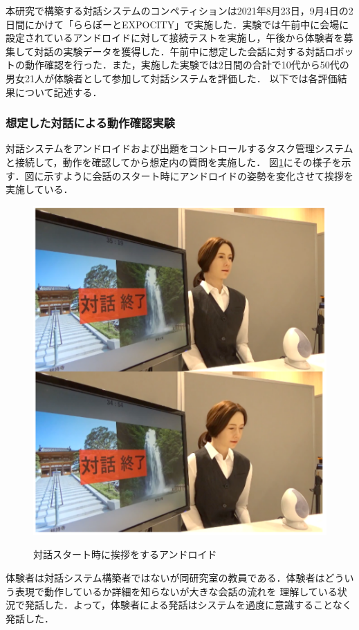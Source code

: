 本研究で構築する対話システムのコンペティションは2021年8月23日，9月4日の2日間にかけて「ららぽーとEXPOCITY」で実施した．実験では午前中に会場に設定されているアンドロイドに対して接続テストを実施し，午後から体験者を募集して対話の実験データを獲得した．午前中に想定した会話に対する対話ロボットの動作確認を行った．また，実施した実験では2日間の合計で10代から50代の男女21人が体験者として参加して対話システムを評価した．
以下では各評価結果について記述する．

\subsubsection{想定した対話による動作確認実験}
対話システムをアンドロイドおよび出題をコントロールするタスク管理システムと接続して，動作を確認してから想定内の質問を実施した．
図\ref{fig:android1}にその様子を示す．図に示すように会話のスタート時にアンドロイドの姿勢を変化させて挨拶を実施している．
%
\begin{figure}[h]
        \centering
        \includegraphics[scale=0.5]{pic/android1.pdf}
        \label{fig:android1}
        \caption{対話スタート時に挨拶をするアンドロイド}
\end{figure}
体験者は対話システム構築者ではないが同研究室の教員である．体験者はどういう表現で動作しているか詳細を知らないが大きな会話の流れを
理解している状況で発話した．よって，体験者による発話はシステムを過度に意識することなく発話した．

